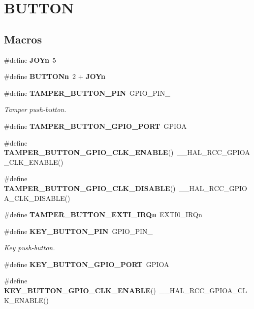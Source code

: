 \section{B\+U\+T\+T\+ON}
\label{group___b_u_t_t_o_n}
\subsection*{Macros}
\begin{DoxyCompactItemize}
\item 
\#define \textbf{ J\+O\+Yn}~5
\item 
\#define \textbf{ B\+U\+T\+T\+O\+Nn}~2 + \textbf{ J\+O\+Yn}
\item 
\#define \textbf{ T\+A\+M\+P\+E\+R\+\_\+\+B\+U\+T\+T\+O\+N\+\_\+\+P\+IN}~G\+P\+I\+O\+\_\+\+P\+I\+N\+\_
\begin{DoxyCompactList}\small\item\em Tamper push-\/button. \end{DoxyCompactList}\item 
\#define \textbf{ T\+A\+M\+P\+E\+R\+\_\+\+B\+U\+T\+T\+O\+N\+\_\+\+G\+P\+I\+O\+\_\+\+P\+O\+RT}~G\+P\+I\+OA
\item 
\#define \textbf{ T\+A\+M\+P\+E\+R\+\_\+\+B\+U\+T\+T\+O\+N\+\_\+\+G\+P\+I\+O\+\_\+\+C\+L\+K\+\_\+\+E\+N\+A\+B\+LE}()~\+\_\+\+\_\+\+H\+A\+L\+\_\+\+R\+C\+C\+\_\+\+G\+P\+I\+O\+A\+\_\+\+C\+L\+K\+\_\+\+E\+N\+A\+B\+LE()
\item 
\#define \textbf{ T\+A\+M\+P\+E\+R\+\_\+\+B\+U\+T\+T\+O\+N\+\_\+\+G\+P\+I\+O\+\_\+\+C\+L\+K\+\_\+\+D\+I\+S\+A\+B\+LE}()~\+\_\+\+\_\+\+H\+A\+L\+\_\+\+R\+C\+C\+\_\+\+G\+P\+I\+O\+A\+\_\+\+C\+L\+K\+\_\+\+D\+I\+S\+A\+B\+LE()
\item 
\#define \textbf{ T\+A\+M\+P\+E\+R\+\_\+\+B\+U\+T\+T\+O\+N\+\_\+\+E\+X\+T\+I\+\_\+\+I\+R\+Qn}~E\+X\+T\+I0\+\_\+\+I\+R\+Qn
\item 
\#define \textbf{ K\+E\+Y\+\_\+\+B\+U\+T\+T\+O\+N\+\_\+\+P\+IN}~G\+P\+I\+O\+\_\+\+P\+I\+N\+\_
\begin{DoxyCompactList}\small\item\em Key push-\/button. \end{DoxyCompactList}\item 
\#define \textbf{ K\+E\+Y\+\_\+\+B\+U\+T\+T\+O\+N\+\_\+\+G\+P\+I\+O\+\_\+\+P\+O\+RT}~G\+P\+I\+OA
\item 
\#define \textbf{ K\+E\+Y\+\_\+\+B\+U\+T\+T\+O\+N\+\_\+\+G\+P\+I\+O\+\_\+\+C\+L\+K\+\_\+\+E\+N\+A\+B\+LE}()~\+\_\+\+\_\+\+H\+A\+L\+\_\+\+R\+C\+C\+\_\+\+G\+P\+I\+O\+A\+\_\+\+C\+L\+K\+\_\+\+E\+N\+A\+B\+LE()

\end{DoxyCompactItemize}
